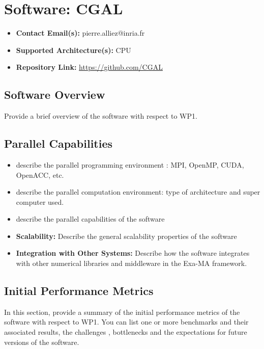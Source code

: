 \section{Software: CGAL}
\label{sec:WP1:CGAL:software}

\begin{itemize}
    \item \textbf{Contact Email(s):} pierre.alliez@inria.fr
    \item \textbf{Supported Architecture(s):} CPU
    \item \textbf{Repository Link:} \href{https://github.com/CGAL}{https://github.com/CGAL}
\end{itemize}

\subsection{Software Overview}
\label{sec:WP1:CGAL:summary}

Provide a brief overview of the software with respect to WP1.

\subsection{Parallel Capabilities}
\label{sec:WP1:CGAL:performances}


\begin{itemize}
    \item describe the parallel programming  environment : MPI, OpenMP, CUDA, OpenACC, etc.
    \item describe the parallel computation environment: type of architecture and super computer used.
    \item describe the parallel capabilities of the software
    \item \textbf{Scalability:} Describe the general scalability properties of the software
    \item \textbf{Integration with Other Systems:} Describe how the software integrates with other numerical libraries and middleware in the Exa-MA framework.
\end{itemize}

\subsection{Initial Performance Metrics}
\label{sec:WP1:CGAL:metrics}

In this section, provide a summary of the initial performance metrics of the software with respect to WP1.
You can list one or more benchmarks and their associated results, the challenges , bottlenecks and the expectations for future versions of the software.



